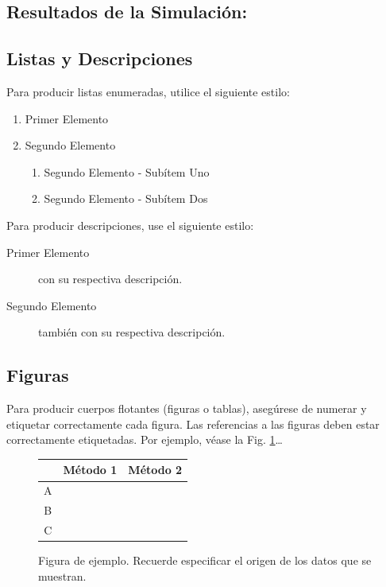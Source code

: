 \documentclass[12pt]{amsart}
\begin{document}
\subsection{Resultados de la Simulación:}

	\subsection{Listas y Descripciones}\label{sub:lists}
		Para producir listas enumeradas, utilice el siguiente estilo:
		\begin{enumerate}
			\item Primer Elemento
			\item Segundo Elemento
			\begin {enumerate}
				\item {Segundo Elemento - Subítem Uno}
				\item {Segundo Elemento - Subítem Dos}
			\end {enumerate}
		\end{enumerate}

		Para producir descripciones, use el siguiente estilo:

		\begin{description}
			\item [Primer Elemento] con su respectiva descripción.
			\item [Segundo Elemento] también con su respectiva descripción.
		\end{description}

	\subsection{Figuras}\label{sub:figures}
		Para producir cuerpos flotantes (figuras o tablas), asegúrese de numerar
		y etiquetar correctamente cada figura. Las referencias a las figuras deben
		estar correctamente etiquetadas. Por ejemplo, véase la Fig. \ref{fig:ex}\ldots

		\begin{figure}[h!]%
		\begin{center}
			\begin{tabular}{|c|c|c|} \hline
			 			& Método 1 	& Método 2 	\\ \hline
			A 			&  			&  			\\ \hline
			B			& 			& 			\\ \hline
			C 			& 			&  			\\ \hline
			\end{tabular}
		\caption{Figura de ejemplo. Recuerde especificar el origen de los datos que se muestran. \label{fig:ex}}
		\end{center}
		\end{figure}
\end{document}
